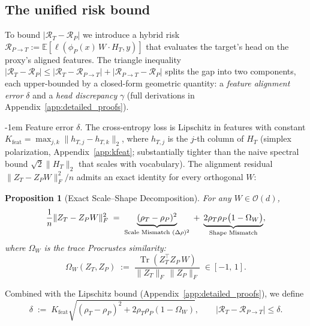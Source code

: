 \documentclass{article}
\makeatletter
\newtheorem{proposition}{Proposition}
\newlength{\paraSpace}
\renewcommand{\paragraph}{\@startsection{paragraph}{4}{\z@}%
  {\paraSpace}{-1em}%
  {\normalfont\normalsize\bfseries}}
\makeatother
\begin{document}
\subsection{The unified risk bound}
\label{subsec:unified_bound}

To bound $|\mathcal{R}_T - \mathcal{R}_P|$ we introduce a hybrid risk $\mathcal{R}_{P \to T} := \mathbb{E}[\ell(\phi_P(x)\,W \cdot H_T, y)]$ that evaluates the target's head on the proxy's aligned features. The triangle inequality $|\mathcal{R}_T - \mathcal{R}_P| \le |\mathcal{R}_T - \mathcal{R}_{P\to T}| + |\mathcal{R}_{P\to T} - \mathcal{R}_P|$ splits the gap into two components, each upper-bounded by a closed-form geometric quantity: a \emph{feature alignment error} $\delta$ and a \emph{head discrepancy} $\gamma$ (full derivations in Appendix~\ref{app:detailed_proofs}).

\paragraph{Feature error $\delta$.}
The cross-entropy loss is Lipschitz in features with constant $K_{\mathrm{feat}} = \max_{j,k}\|h_{T,j}-h_{T,k}\|_2$, where $h_{T,j}$ is the $j$-th column of $H_T$ (simplex polarization, Appendix~\ref{app:kfeat}; substantially tighter than the naive spectral bound $\sqrt{2}\|H_T\|_2$ that scales with vocabulary). The alignment residual $\|Z_T - Z_P W\|_F^2 / n$ admits an exact identity for every orthogonal $W$:

\begin{proposition}[Exact Scale--Shape Decomposition]
\label{prop:exact_decomposition}
For any $W \in \mathcal{O}(d)$,
\begin{equation}
\label{eq:exact_equality}
\frac{1}{n} \| Z_T - Z_P W \|_F^2
\;=\;
\underbrace{(\rho_T - \rho_P)^2}_{\text{\rm Scale Mismatch } (\Delta\rho)^2}
\;+\;
\underbrace{2 \rho_T \rho_P \big( 1 - \Omega_W \big)}_{\text{\rm Shape Mismatch}},
\end{equation}
where $\Omega_W$ is the \emph{trace Procrustes similarity}:
\begin{equation}
\label{eq:omega_def}
\Omega_W(Z_T, Z_P) \;:=\; \frac{\operatorname{Tr}(Z_T^\top Z_P\, W)}{\| Z_T \|_F\, \| Z_P \|_F} \;\in [-1,\, 1].
\end{equation}
\end{proposition}

Combined with the Lipschitz bound (Appendix~\ref{app:detailed_proofs}), we define
\begin{equation}
\label{eq:delta_bound}
\delta \;:=\; K_{\mathrm{feat}} \sqrt{(\rho_T - \rho_P)^2 + 2\rho_T \rho_P (1 - \Omega_W)}, \qquad |\mathcal{R}_T - \mathcal{R}_{P\to T}| \le \delta.
\end{equation}
\end{document}

